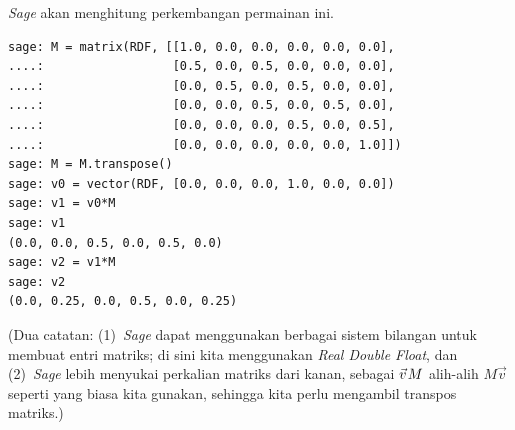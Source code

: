\textit{Sage} akan menghitung perkembangan permainan ini.
\begin{lstlisting}
sage: M = matrix(RDF, [[1.0, 0.0, 0.0, 0.0, 0.0, 0.0],
....:                  [0.5, 0.0, 0.5, 0.0, 0.0, 0.0],
....:                  [0.0, 0.5, 0.0, 0.5, 0.0, 0.0],
....:                  [0.0, 0.0, 0.5, 0.0, 0.5, 0.0],
....:                  [0.0, 0.0, 0.0, 0.5, 0.0, 0.5],
....:                  [0.0, 0.0, 0.0, 0.0, 0.0, 1.0]])
sage: M = M.transpose()
sage: v0 = vector(RDF, [0.0, 0.0, 0.0, 1.0, 0.0, 0.0])
sage: v1 = v0*M
sage: v1
(0.0, 0.0, 0.5, 0.0, 0.5, 0.0)
sage: v2 = v1*M
sage: v2
(0.0, 0.25, 0.0, 0.5, 0.0, 0.25)  
\end{lstlisting}
(Dua catatan: (1)~\textit{Sage} dapat menggunakan berbagai sistem bilangan
untuk membuat entri matriks; di sini kita menggunakan \textit{Real Double
Float}, dan (2)~\textit{Sage} lebih menyukai perkalian matriks dari kanan,
sebagai $\vec{v}\hspace{.1em}M$ alih-alih $M\vec{v}$ seperti yang biasa kita
gunakan, sehingga kita perlu mengambil transpos matriks.)

